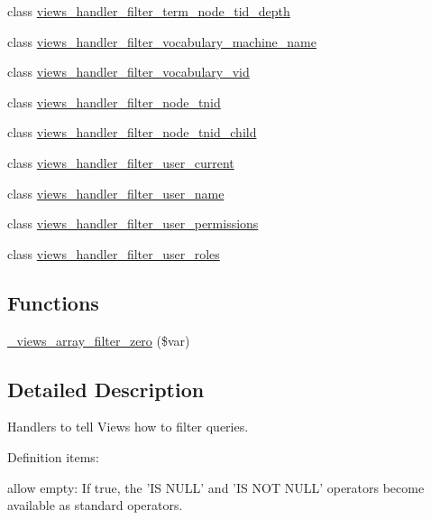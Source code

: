 \begin{DoxyCompactItemize}
\item 
class \hyperlink{classviews__handler__filter__term__node__tid__depth}{views\_\-handler\_\-filter\_\-term\_\-node\_\-tid\_\-depth}
\item 
class \hyperlink{classviews__handler__filter__vocabulary__machine__name}{views\_\-handler\_\-filter\_\-vocabulary\_\-machine\_\-name}
\item 
class \hyperlink{classviews__handler__filter__vocabulary__vid}{views\_\-handler\_\-filter\_\-vocabulary\_\-vid}
\item 
class \hyperlink{classviews__handler__filter__node__tnid}{views\_\-handler\_\-filter\_\-node\_\-tnid}
\item 
class \hyperlink{classviews__handler__filter__node__tnid__child}{views\_\-handler\_\-filter\_\-node\_\-tnid\_\-child}
\item 
class \hyperlink{classviews__handler__filter__user__current}{views\_\-handler\_\-filter\_\-user\_\-current}
\item 
class \hyperlink{classviews__handler__filter__user__name}{views\_\-handler\_\-filter\_\-user\_\-name}
\item 
class \hyperlink{classviews__handler__filter__user__permissions}{views\_\-handler\_\-filter\_\-user\_\-permissions}
\item 
class \hyperlink{classviews__handler__filter__user__roles}{views\_\-handler\_\-filter\_\-user\_\-roles}
\end{DoxyCompactItemize}
\subsection*{Functions}
\begin{DoxyCompactItemize}
\item 
\hyperlink{group__views__filter__handlers_ga4877cb7e6a7e3cda21438608fa979cbb}{\_\-views\_\-array\_\-filter\_\-zero} (\$var)
\end{DoxyCompactItemize}


\subsection{Detailed Description}
Handlers to tell Views how to filter queries.

Definition items:
\begin{DoxyItemize}
\item allow empty: If true, the 'IS NULL' and 'IS NOT NULL' operators become available as standard operators.
\end{DoxyItemize}

